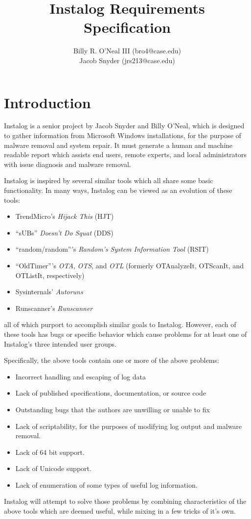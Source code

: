 \documentclass[letterpaper,12pt]{article}
\title{Instalog Requirements Specification}
\author{
Billy R. O'Neal III (bro4@case.edu) \\
Jacob Snyder (jrs213@case.edu)
}
\begin{document}
\maketitle

\section{Introduction}
Instalog is a senior project by Jacob Snyder and Billy O'Neal, which is designed
to gather information from Microsoft Windows installations, for the purpose of
malware removal and system repair.  It must generate a human and machine
readable report which assists end users, remote experts, and local
administrators with issue diagnosis and malware removal.

Instalog is inspired by several similar tools which all share some basic
functionality.  In many ways, Instalog can be viewed as an evolution of
these tools:
\begin{itemize}
    \item TrendMicro's {\em Hijack This} (HJT)
    \item ``sUBs'' {\em Doesn't Do Squat} (DDS)
    \item ``random/random'''s {\em Random's System Information Tool} (RSIT)
    \item ``OldTimer'''s {\em OTA}, {\em OTS}, and {\em OTL} (formerly
    OTAnalyzeIt, OTScanIt, and OTListIt, respectively)
    \item Sysinternals' {\em Autoruns}
    \item Runscanner's {\em Runscanner}
\end{itemize}
all of which purport to accomplish similar goals to Instalog. However, each of
these tools has bugs or specific behavior which cause problems for at least one
of Instalog's three intended user groups.

Specifically, the above tools contain one or more of the above problems:
\begin{itemize}
    \item Incorrect handling and escaping of log data
    \item Lack of published specifications, documentation, or source code
    \item Outstanding bugs that the authors are unwilling or unable to fix
    \item Lack of scriptability, for the purposes of modifying log output and
    malware removal.
    \item Lack of 64 bit support.
    \item Lack of Unicode support.
    \item Lack of enumeration of some types of useful log information.
\end{itemize}
Instalog will attempt to solve those problems by combining characteristics of
the above tools which are deemed useful, while mixing in a few tricks of it's
own.
\end{document}
